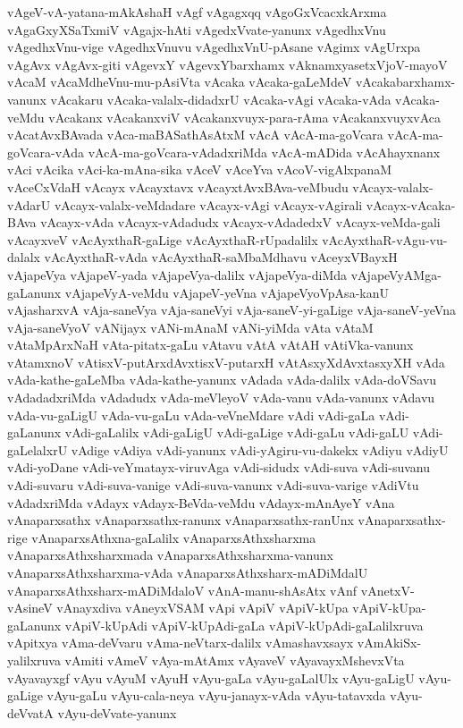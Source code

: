 {vAgeV-vA-yatana-mAkAshaH
vAgf
vAgagxqq
vAgoGxVcacxkArxma
vAgaGxyXSaTxmiV
vAgajx-hAti
vAgedxVvate-yanunx
vAgedhxVnu
vAgedhxVnu-vige
vAgedhxVnuvu
vAgedhxVnU-pAsane
vAgimx
vAgUrxpa
vAgAvx
vAgAvx-giti
vAgevxY
vAgevxYbarxhamx
vAknamxyasetxVjoV-mayoV
vAcaM
vAcaMdheVnu-mu-pAsiVta
vAcaka
vAcaka-gaLeMdeV
vAcakabarxhamx-vanunx
vAcakaru
vAcaka-valalx-didadxrU
vAcaka-vAgi
vAcaka-vAda
vAcaka-veMdu
vAcakanx
vAcakanxviV
vAcakanxvuyx-para-rAma
vAcakanxvuyxvAca
vAcatAvxBAvada
vAca-maBASathAsAtxM
vAcA
vAcA-ma-goVcara
vAcA-ma-goVcara-vAda
vAcA-ma-goVcara-vAdadxriMda
vAcA-mADida
vAcAhayxnanx
vAci
vAcika
vAci-ka-mAna-sika
vAceV
vAceYva
vAcoV-vigAlxpanaM
vAceCxVdaH
vAcayx
vAcayxtavx
vAcayxtAvxBAva-veMbudu
vAcayx-valalx-vAdarU
vAcayx-valalx-veMdadare
vAcayx-vAgi
vAcayx-vAgirali
vAcayx-vAcaka-BAva
vAcayx-vAda
vAcayx-vAdadudx
vAcayx-vAdadedxV
vAcayx-veMda-gali
vAcayxveV
vAcAyxthaR-gaLige
vAcAyxthaR-rUpadalilx
vAcAyxthaR-vAgu-vu-dalalx
vAcAyxthaR-vAda
vAcAyxthaR-saMbaMdhavu
vAceyxVBayxH
vAjapeVya
vAjapeV-yada
vAjapeVya-dalilx
vAjapeVya-diMda
vAjapeVyAMga-gaLanunx
vAjapeVyA-veMdu
vAjapeV-yeVna
vAjapeVyoVpAsa-kanU
vAjasharxvA
vAja-saneVya
vAja-saneVyi
vAja-saneV-yi-gaLige
vAja-saneV-yeVna
vAja-saneVyoV
vANijayx
vANi-mAnaM
vANi-yiMda
vAta
vAtaM
vAtaMpArxNaH
vAta-pitatx-gaLu
vAtavu
vAtA
vAtAH
vAtiVka-vanunx
vAtamxnoV
vAtisxV-putArxdAvxtisxV-putarxH
vAtAsxyXdAvxtasxyXH
vAda
vAda-kathe-gaLeMba
vAda-kathe-yanunx
vAdada
vAda-dalilx
vAda-doVSavu
vAdadadxriMda
vAdadudx
vAda-meVleyoV
vAda-vanu
vAda-vanunx
vAdavu
vAda-vu-gaLigU
vAda-vu-gaLu
vAda-veVneMdare
vAdi
vAdi-gaLa
vAdi-gaLanunx
vAdi-gaLalilx
vAdi-gaLigU
vAdi-gaLige
vAdi-gaLu
vAdi-gaLU
vAdi-gaLelalxrU
vAdige
vAdiya
vAdi-yanunx
vAdi-yAgiru-vu-dakekx
vAdiyu
vAdiyU
vAdi-yoDane
vAdi-veYmatayx-viruvAga
vAdi-sidudx
vAdi-suva
vAdi-suvanu
vAdi-suvaru
vAdi-suva-vanige
vAdi-suva-vanunx
vAdi-suva-varige
vAdiVtu
vAdadxriMda
vAdayx
vAdayx-BeVda-veMdu
vAdayx-mAnAyeY
vAna
vAnaparxsathx
vAnaparxsathx-ranunx
vAnaparxsathx-ranUnx
vAnaparxsathx-rige
vAnaparxsAthxna-gaLalilx
vAnaparxsAthxsharxma
vAnaparxsAthxsharxmada
vAnaparxsAthxsharxma-vanunx
vAnaparxsAthxsharxma-vAda
vAnaparxsAthxsharx-mADiMdalU
vAnaparxsAthxsharx-mADiMdaloV
vAnA-manu-shAsAtx
vAnf
vAnetxV-vAsineV
vAnayxdiva
vAneyxVSAM
vApi
vApiV
vApiV-kUpa
vApiV-kUpa-gaLanunx
vApiV-kUpAdi
vApiV-kUpAdi-gaLa
vApiV-kUpAdi-gaLalilxruva
vApitxya
vAma-deVvaru
vAma-neVtarx-dalilx
vAmashavxsayx
vAmAkiSx-yalilxruva
vAmiti
vAmeV
vAya-mAtAmx
vAyaveV
vAyavayxMshevxVta
vAyavayxgf
vAyu
vAyuM
vAyuH
vAyu-gaLa
vAyu-gaLalUlx
vAyu-gaLigU
vAyu-gaLige
vAyu-gaLu
vAyu-cala-neya
vAyu-janayx-vAda
vAyu-tatavxda
vAyu-deVvatA
vAyu-deVvate-yanunx
}
